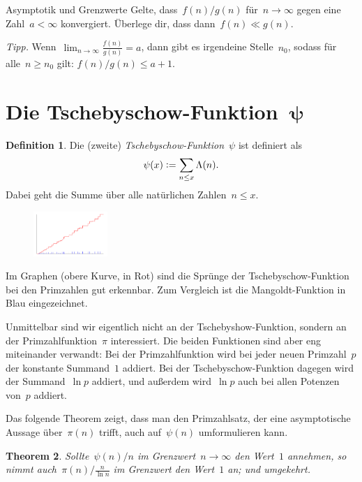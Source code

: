 \documentclass[twoside]{../zirkelblatt1415}
\theoremstyle{definition}
\newtheorem{defn}{Definition}[section]
\theoremstyle{plain}
\newtheorem{thm}[defn]{Theorem}
\theoremstyle{remark}
\newcommand{\defeq}{\vcentcolon=}
\begin{document}
\begin{aufgabe}{Asymptotik und Grenzwerte}\label{aufg:asymp-limes}
Gelte, dass~$f(n) / g(n)$ für~$n \to \infty$ gegen eine Zahl~$a < \infty$
konvergiert. Überlege dir, dass dann~$f(n) \ll g(n)$.

\emph{Tipp.} Wenn~$\lim_{n \to \infty} \frac{f(n)}{g(n)} = a$, dann gibt es
irgendeine Stelle~$n_0$, sodass für alle~$n \geq n_0$ gilt: $f(n)/g(n) \leq
a+1$.
\end{aufgabe}


\section{\texorpdfstring{Die Tschebyschow-Funktion~$\boldsymbol{\psi}$}{Die
Tschebyschow-Funktion~ψ}}

\begin{defn}Die (zweite) \emph{Tschebyschow-Funktion}~$\psi$ ist definiert als
\[ \psi(x) \defeq \sum_{n \leq x} \Lambda(n). \]
Dabei geht die Summe über alle natürlichen Zahlen~$n \leq x$.\end{defn}

\begin{figure}
  \vspace{-2em}
  \includegraphics[width=0.25\textwidth]{chebyshev-function}
\end{figure}
Im Graphen (obere Kurve, in Rot) sind die Sprünge der Tschebyschow-Funktion bei
den Primzahlen gut erkennbar. Zum Vergleich ist die Mangoldt-Funktion in Blau
eingezeichnet.

Unmittelbar sind wir eigentlich nicht an der Tschebyshow-Funktion, sondern an
der Primzahlfunktion~$\pi$ interessiert. Die beiden Funktionen sind aber eng
miteinander verwandt: Bei der Primzahlfunktion wird bei jeder neuen
Primzahl~$p$ der konstante Summand~$1$ addiert. Bei der Tschebyschow-Funktion
dagegen wird der Summand~$\ln p$ addiert, und außerdem wird~$\ln p$ auch bei
allen Potenzen von~$p$ addiert.

Das folgende Theorem zeigt, dass man den Primzahlsatz, der eine asymptotische
Aussage über~$\pi(n)$ trifft, auch auf~$\psi(n)$ umformulieren kann.

\begin{thm}\label{thm:psi-pi}
Sollte~$\psi(n)/n$ im Grenzwert~$n \to \infty$ den Wert~$1$ annehmen, so nimmt
auch~$\pi(n)/\frac{n}{\ln n}$ im Grenzwert den Wert~$1$ an; und umgekehrt.
\end{thm}
\end{document}
